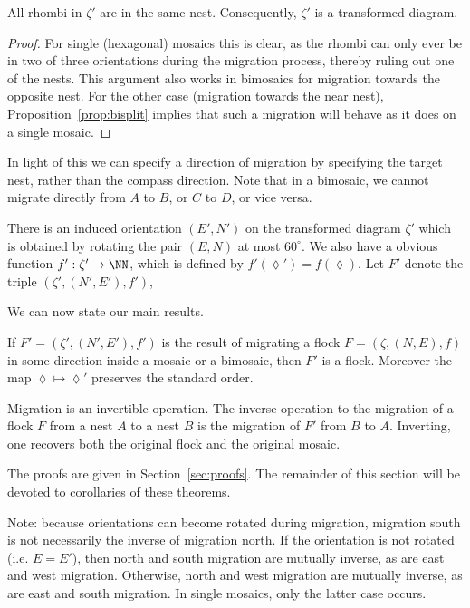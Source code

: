 \begin{proposition}
\label{prop:samenest}
All rhombi in $\zeta'$ are in the same nest.
Consequently, $\zeta'$ is a transformed diagram.
\end{proposition}

\begin{proof}
For single (hexagonal) mosaics this is clear, as the rhombi can only ever 
be in 
two of three orientations during the migration process, thereby ruling
out one of the nests.  This argument also works in 
bimosaics for migration towards the opposite nest.  For the other
case (migration towards the near nest), 
Proposition~\ref{prop:bisplit} implies that such a migration 
will behave as it does on a single mosaic.
\end{proof}

In light of this we can specify a direction of migration by specifying
the target nest, rather than the compass direction.  Note that in
a bimosaic, we cannot migrate directly from $A$ to $B$, or 
$C$ to $D$, or vice versa.

There is an induced orientation $(E',N')$ on the transformed
diagram $\zeta'$
which is obtained by rotating the pair $(E,N)$ at most $60^\circ$.
We also have a obvious function $f':\zeta' \to \NN$, which
is defined by $f'(\lozenge') = f(\lozenge)$.  Let $F'$ denote the triple
$(\zeta', (N',E'), f')$,

We can now state our main results.  
\begin{theorem}
\label{thm:isflock}
If $F'=(\zeta', (N',E'), f')$ is the result of migrating a flock 
$F = (\zeta, (N,E), f)$ in some direction inside a mosaic or
a bimosaic, then $F'$ is a flock.  Moreover the map
$\lozenge \mapsto \lozenge'$ preserves the standard order.
\end{theorem}

\begin{theorem}
\label{thm:invertible}
Migration is an invertible operation. 
The inverse operation to
the migration of a flock $F$ from
a nest $A$ to a nest $B$ is the migration of $F'$ from $B$ to $A$.
Inverting, one recovers both the original flock and the 
original mosaic.
\end{theorem}

The proofs are given 
in Section~\ref{sec:proofs}.  The remainder of this section will
be devoted to corollaries of these theorems.


Note: because orientations can become rotated during migration,
migration south is not necessarily the inverse of migration north.
If the orientation is
not rotated (i.e. $E = E'$), then north and south migration are mutually 
inverse, as are east and west migration.
Otherwise, north and west migration are mutually inverse,
as are east and south migration.  In single mosaics, only the latter
case occurs.


